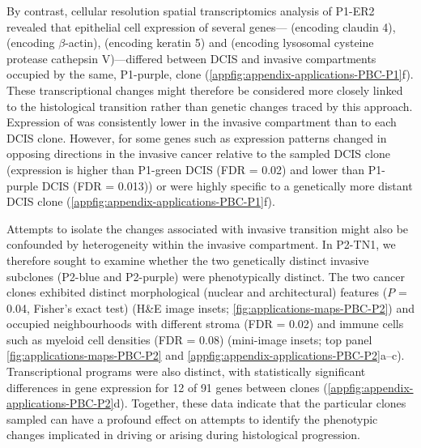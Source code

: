 By contrast, cellular resolution spatial transcriptomics analysis of P1-ER2 revealed that epithelial cell expression of several genes— (encoding claudin 4),  (encoding $\beta$-actin),  (encoding keratin 5) and  (encoding lysosomal cysteine protease cathepsin V)—differed between \ac{DCIS} and invasive compartments occupied by the same, P1-purple, clone (\cref{appfig:appendix-applications-PBC-P1}f). These transcriptional changes might therefore be considered more closely linked to the histological transition rather than genetic changes traced by this approach. Expression of  was consistently lower in the invasive compartment than to each \ac{DCIS} clone. However, for some genes such as  expression patterns changed in opposing directions in the invasive cancer relative to the sampled \ac{DCIS} clone (expression is higher than P1-green \ac{DCIS} (\ac{FDR} = 0.02) and lower than P1-purple \ac{DCIS} (\ac{FDR} = 0.013)) or were highly specific to a genetically more distant \ac{DCIS} clone (\cref{appfig:appendix-applications-PBC-P1}f).

Attempts to isolate the changes associated with invasive transition might also be confounded by heterogeneity within the invasive compartment. In P2-TN1, we therefore sought to examine whether the two genetically distinct invasive subclones (P2-blue and P2-purple) were phenotypically distinct. The two cancer clones exhibited distinct morphological (nuclear and architectural) features ($P$ = 0.04, Fisher’s exact test) (H\&E image insets; \cref{fig:applications-maps-PBC-P2}) and occupied neighbourhoods with different stroma (\ac{FDR} = 0.02) and immune cells such as myeloid cell densities (\ac{FDR} = 0.08) (mini-image insets; top panel \cref{fig:applications-maps-PBC-P2} and \cref{appfig:appendix-applications-PBC-P2}a–c). Transcriptional programs were also distinct, with statistically significant differences in gene expression for 12 of 91 genes between clones (\cref{appfig:appendix-applications-PBC-P2}d). Together, these data indicate that the particular clones sampled can have a profound effect on attempts to identify the phenotypic changes implicated in driving or arising during histological progression.

